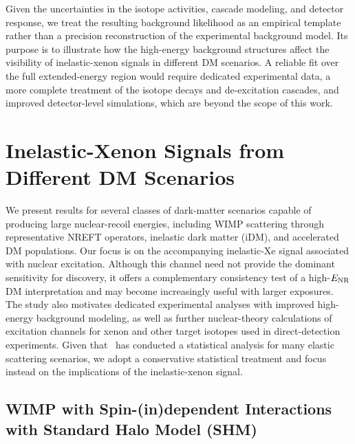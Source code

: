 \documentclass[11pt,a4paper]{article}
\begin{document}
Given the uncertainties in the isotope activities, cascade modeling, and detector response, we treat the resulting background likelihood as an empirical template rather than a precision reconstruction of the experimental background model. Its purpose is to illustrate how the high-energy background structures affect the visibility of inelastic-xenon signals in different DM scenarios. A reliable fit over the full extended-energy region would require dedicated experimental data, a more complete treatment of the isotope decays and de-excitation cascades, and improved detector-level simulations, which are beyond the scope of this work.


\section{Inelastic-Xenon Signals from Different DM Scenarios}
\label{sec:results}
We present results for several classes of dark-matter scenarios capable of producing large nuclear-recoil energies, including WIMP scattering through representative NREFT operators, inelastic dark matter (iDM), and accelerated DM populations. Our focus is on the accompanying inelastic-Xe signal associated with nuclear excitation. Although this channel need not provide the dominant sensitivity for discovery, it offers a complementary consistency test of a high-$E_{\rm NR}$ DM interpretation and may become increasingly useful with larger exposures. The study also motivates dedicated experimental analyses with improved high-energy background modeling, as well as further nuclear-theory calculations of excitation channels for xenon and other target isotopes used in direct-detection experiments. Given that~\cite{LZ2026} has conducted a statistical analysis for many elastic scattering scenarios, we adopt a conservative statistical treatment and focus instead on the implications of the inelastic-xenon signal. 


\subsection{WIMP with Spin-(in)dependent Interactions with Standard Halo Model (SHM)}
\label{ssec:vanilla_results}
\end{document}
